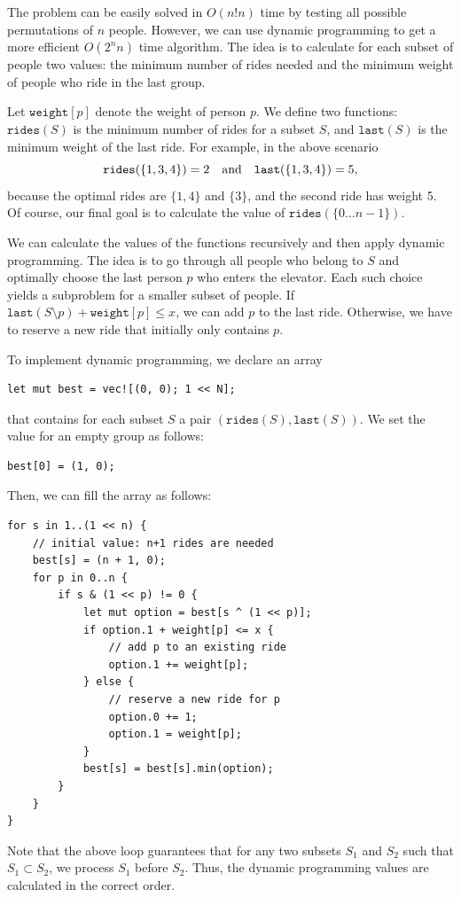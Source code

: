 The problem can be easily solved in $O(n! n)$ time
by testing all possible permutations of $n$ people.
However, we can use dynamic programming to get
a more efficient $O(2^n n)$ time algorithm.
The idea is to calculate for each subset of people
two values: the minimum number of rides needed and
the minimum weight of people who ride in the last group.

Let $\texttt{weight}[p]$ denote the weight of
person $p$.
We define two functions:
$\texttt{rides}(S)$ is the minimum number of
rides for a subset $S$,
and $\texttt{last}(S)$ is the minimum weight
of the last ride.
For example, in the above scenario
\[ \texttt{rides}(\{1,3,4\})=2 \hspace{10px} \textrm{and}
\hspace{10px} \texttt{last}(\{1,3,4\})=5,\]
because the optimal rides are $\{1,4\}$ and $\{3\}$,
and the second ride has weight 5.
Of course, our final goal is to calculate the value
of $\texttt{rides}(\{0 \ldots n-1\})$.

We can calculate the values
of the functions recursively and then apply
dynamic programming.
The idea is to go through all people
who belong to $S$ and optimally
choose the last person $p$ who enters the elevator.
Each such choice yields a subproblem
for a smaller subset of people.
If $\texttt{last}(S \setminus p)+\texttt{weight}[p] \le x$,
we can add $p$ to the last ride.
Otherwise, we have to reserve a new ride
that initially only contains $p$.

To implement dynamic programming,
we declare an array
\begin{lstlisting}
let mut best = vec![(0, 0); 1 << N];
\end{lstlisting}
that contains for each subset $S$
a pair $(\texttt{rides}(S),\texttt{last}(S))$.
We set the value for an empty group as follows:
\begin{lstlisting}
best[0] = (1, 0);
\end{lstlisting}
Then, we can fill the array as follows:

\begin{lstlisting}
for s in 1..(1 << n) {
    // initial value: n+1 rides are needed
    best[s] = (n + 1, 0);
    for p in 0..n {
        if s & (1 << p) != 0 {
            let mut option = best[s ^ (1 << p)];
            if option.1 + weight[p] <= x {
                // add p to an existing ride
                option.1 += weight[p];
            } else {
                // reserve a new ride for p
                option.0 += 1;
                option.1 = weight[p];
            }
            best[s] = best[s].min(option);
        }
    }
}
\end{lstlisting}
Note that the above loop guarantees that
for any two subsets $S_1$ and $S_2$
such that $S_1 \subset S_2$, we process $S_1$ before $S_2$.
Thus, the dynamic programming values are calculated in the
correct order.

